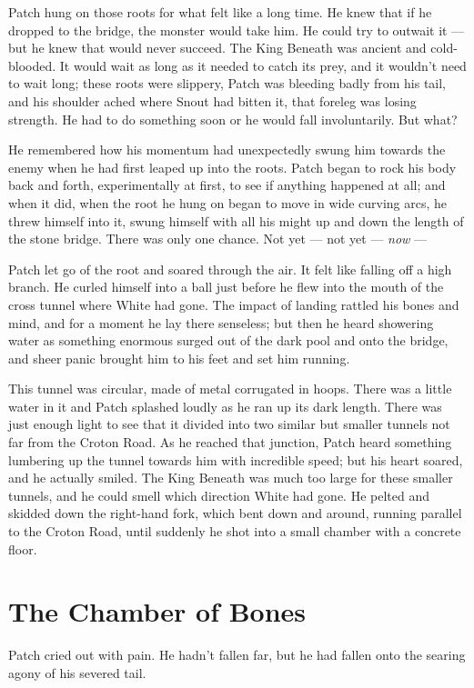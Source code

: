 \documentclass[ebook,oneside,openany,12pt]{memoir}
\begin{document}
Patch hung on those roots for what felt like a long time. He knew that
if he dropped to the bridge, the monster would take him. He could try
to outwait it — but he knew that would never succeed. The King Beneath
was ancient and cold-blooded. It would wait as long as it needed to
catch its prey, and it wouldn’t need to wait long; these roots were
slippery, Patch was bleeding badly from his tail, and his shoulder
ached where Snout had bitten it, that foreleg was losing strength. He
had to do something soon or he would fall involuntarily. But what?

He remembered how his momentum had unexpectedly swung him towards the
enemy when he had first leaped up into the roots. Patch began to rock
his body back and forth, experimentally at first, to see if anything
happened at all; and when it did, when the root he hung on began to
move in wide curving arcs, he threw himself into it, swung himself
with all his might up and down the length of the stone bridge. There
was only one chance. Not yet — not yet — \emph{now} —

Patch let go of the root and soared through the air. It felt like
falling off a high branch. He curled himself into a ball just before
he flew into the mouth of the cross tunnel where White had gone. The
impact of landing rattled his bones and mind, and for a moment he lay
there senseless; but then he heard showering water as something
enormous surged out of the dark pool and onto the bridge, and sheer
panic brought him to his feet and set him running.

This tunnel was circular, made of metal corrugated in hoops. There was
a little water in it and Patch splashed loudly as he ran up its dark
length. There was just enough light to see that it divided into two
similar but smaller tunnels not far from the Croton Road. As he
reached that junction, Patch heard something lumbering up the tunnel
towards him with incredible speed; but his heart soared, and he
actually smiled. The King Beneath was much too large for these smaller
tunnels, and he could smell which direction White had gone. He pelted
and skidded down the right-hand fork, which bent down and around,
running parallel to the Croton Road, until suddenly he shot into a
small chamber with a concrete floor.


\section{The Chamber of Bones}

Patch cried out with pain. He hadn’t fallen far, but he had fallen
onto the searing agony of his severed tail.
\end{document}
